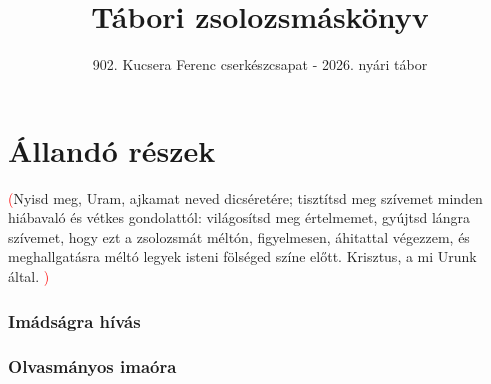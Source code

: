 \documentclass[twoside]{article}
\title{Tábori zsolozsmáskönyv}
\subtitle{902. Kucsera Ferenc cserkészcsapat - 2026. nyári tábor}
\begin{document}
\maketitle

\section*{Állandó részek}

\textcolor{red}{(}Nyisd meg, Uram, ajkamat neved dicséretére; tisztítsd meg szívemet minden
hiába\-való és vétkes gondolattól: világosítsd meg értelmemet, gyújtsd lángra szívemet, hogy ezt a
zsolozsmát méltón, figyelmesen, áhitattal végezzem, és meghallgatásra méltó legyek isteni fölséged
színe előtt. Krisztus, a mi Urunk által. \textcolor{red}{)}

\subsubsection*{Imádságra hívás}


\label{InvMi}



\label{InvFa}



\subsubsection*{Olvasmányos imaóra}










\label{TeDeum}
\end{document}
